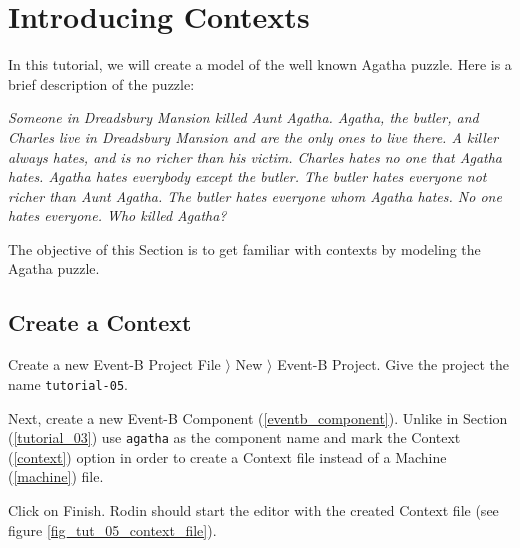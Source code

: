 \section{Introducing Contexts}
\label{tutorial_05}


In this tutorial, we will create a model of the well known Agatha puzzle. Here is a brief description of the puzzle:

\textit{Someone in Dreadsbury Mansion killed Aunt Agatha. Agatha, the butler, and Charles live in Dreadsbury Mansion and are the only ones to live there. A killer always hates, and is no richer than his victim. Charles hates no one that Agatha hates. Agatha hates everybody except the butler. The butler hates everyone not richer than Aunt Agatha. The butler hates everyone whom Agatha hates. No one hates everyone. Who killed Agatha?}

The objective of this Section is to get familiar with contexts by modeling the Agatha puzzle.

\subsection{Create a Context}

Create a new Event-B Project \textsf{File $\rangle$ New $\rangle$ Event-B Project}. Give the project the name \texttt{tutorial-05}. 

Next, create a new Event-B Component (\ref{eventb_component}). Unlike in Section (\ref{tutorial_03}) use \texttt{agatha} as the component name and mark the \textsf{Context} (\ref{context}) option in order to create a Context file instead of a Machine (\ref{machine}) file.


Click on \textsf{Finish}. Rodin should start the editor with the created Context file (see figure \ref{fig_tut_05_context_file}).

